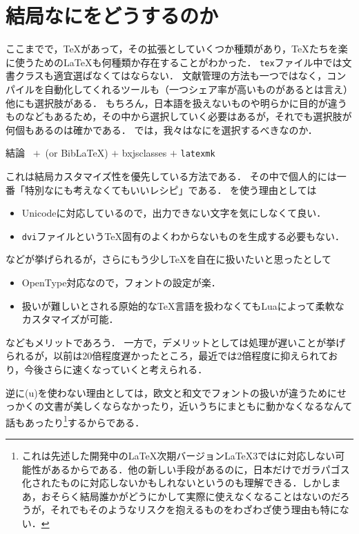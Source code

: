 \documentclass[./main]{subfiles}
\begin{document}
\clearpage
\section{結局なにをどうするのか}
\noindent
ここまでで，\TeX があって，その拡張としていくつか種類があり，\TeX たちを楽に使うための\LaTeX も何種類か存在することがわかった．
\verb|tex|ファイル中では文書クラスも適宜選ばなくてはならない．
文献管理の方法も一つではなく，コンパイルを自動化してくれるツールも（一つシェア率が高いものがあるとは言え）他にも選択肢がある．
もちろん，日本語を扱えないものや明らかに目的が違うものなどもあるため，その中から選択していく必要はあるが，それでも選択肢が何個もあるのは確かである．
では，我々はなにを選択するべきなのか．
\begin{center}
  \begin{minipage}{0.7\linewidth}
    \centering
    \begin{itembox}{結論}
      \centering
      \LuaLaTeX\ $+$ \upBibTeX\,(or Bib\LaTeX) $+$ bxjsclasses $+$ \verb|latexmk| 
    \end{itembox}  
  \end{minipage}\hfill
\end{center}

\noindent これは結局カスタマイズ性を優先している方法である．
その中で個人的には一番「特別なにも考えなくてもいいレシピ」である．
\LuaLaTeX を使う理由としては
\begin{itemize}
  \item Unicodeに対応しているので，出力できない文字を気にしなくて良い．
  \item \verb|dvi|ファイルという\TeX 固有のよくわからないものを生成する必要もない．
\end{itemize}
などが挙げられるが，さらにもう少し\TeX を自在に扱いたいと思ったとして
\begin{itemize}
  \item OpenType対応なので，フォントの設定が楽．
  \item 扱いが難しいとされる原始的な\TeX 言語を扱わなくてもLuaによって柔軟なカスタマイズが可能．
\end{itemize}
などもメリットであろう\supercite{JPLaTeX_Yato}．
一方で，デメリットとして\LuaLaTeX は処理が遅いことが挙げられるが，以前は20倍程度遅かったところ，最近では2倍程度に抑えられており\supercite{LuaTeX_notslow}，今後さらに速くなっていくと考えられる．

逆に(u)\pLaTeX を使わない理由としては，欧文と和文でフォントの扱いが違うためにせっかくの文書が美しくならなかったり，近いうちにまともに動かなくなるなんて話もあったり\supercite{pLaTeX_danger,pLaTeX_pinch}\footnote{これは先述した開発中の\LaTeX 次期バージョン\LaTeX3では\pTeX に対応しない可能性があるからである．他の新しい手段があるのに，日本だけでガラパゴス化されたものに対応しないかもしれないというのも理解できる．しかしまあ，おそらく結局誰かがどうにかして実際に使えなくなることはないのだろうが，それでもそのようなリスクを抱えるものをわざわざ使う理由も特にない．}するからである．
\end{document}
